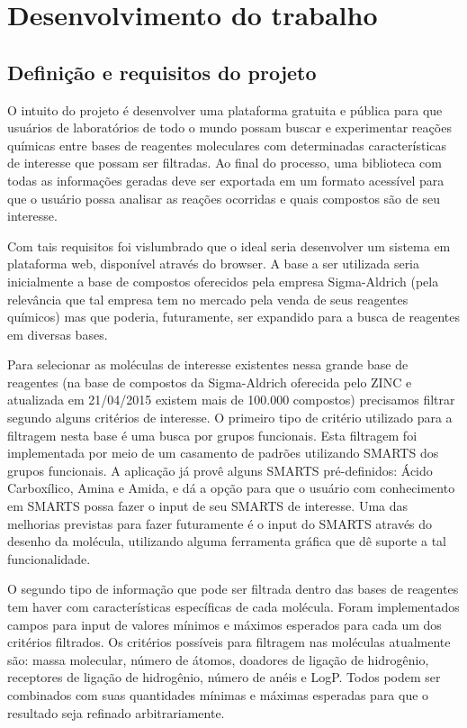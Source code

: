 \documentclass{abnt}
\begin{document}
\chapter{Desenvolvimento do trabalho}

\section{Definição e requisitos do projeto}

O intuito do projeto é desenvolver uma plataforma gratuita e pública para que usuários
de laboratórios de todo o mundo possam buscar e experimentar reações químicas entre
bases de reagentes moleculares com determinadas características de interesse que
possam ser filtradas. Ao final do processo, uma biblioteca com todas as informações
geradas deve ser exportada em um formato acessível para que o usuário possa analisar
as reações ocorridas e quais compostos são de seu interesse.

Com tais requisitos foi vislumbrado que o ideal seria desenvolver um sistema em
plataforma web, disponível através do browser. A base a ser utilizada seria inicialmente
a base de compostos oferecidos pela empresa Sigma-Aldrich (pela relevância que tal
empresa tem no mercado pela venda de seus reagentes químicos) mas que poderia, futuramente,
ser expandido para a busca de reagentes em diversas bases.

Para selecionar as moléculas de interesse existentes nessa grande base de reagentes
(na base de compostos da Sigma-Aldrich oferecida pelo ZINC e atualizada em 21/04/2015
existem mais de 100.000 compostos) precisamos filtrar segundo alguns critérios de
interesse. O primeiro tipo de critério utilizado para a filtragem nesta base é uma
busca por grupos funcionais. Esta filtragem foi implementada por meio de um casamento
de padrões utilizando SMARTS dos grupos funcionais. A aplicação já provê alguns
SMARTS pré-definidos: Ácido Carboxílico, Amina e Amida, e dá a opção para que o
usuário com conhecimento em SMARTS possa fazer o input de seu SMARTS de interesse.
Uma das melhorias previstas para fazer futuramente é o input do SMARTS através do
desenho da molécula, utilizando alguma ferramenta gráfica que dê suporte a tal funcionalidade.

O segundo tipo de informação que pode ser filtrada dentro das bases de reagentes
tem haver com características específicas de cada molécula. Foram implementados
campos para input de valores mínimos e máximos esperados para cada um dos critérios
filtrados. Os critérios possíveis para filtragem nas moléculas atualmente são: massa
molecular, número de átomos, doadores de ligação de hidrogênio, receptores de ligação
de hidrogênio, número de anéis e LogP. Todos podem ser combinados com suas quantidades
mínimas e máximas esperadas para que o resultado seja refinado arbitrariamente.
\end{document}

